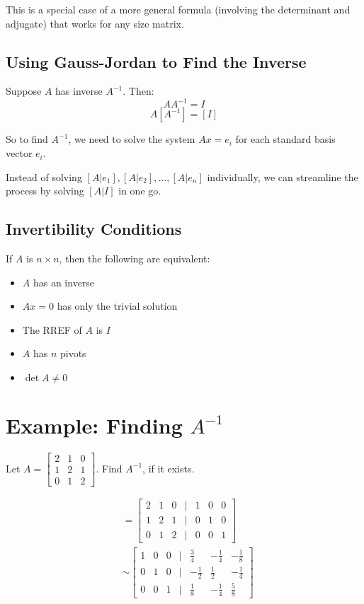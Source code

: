 \documentclass[12pt,a4paper]{article}
\begin{document}
This is a special case of a more general formula (involving the determinant and adjugate) that works for any size matrix.

\subsection{Using Gauss-Jordan to Find the Inverse}

Suppose $A$ has inverse $A^{-1}$. Then:
\[AA^{-1} = I\]
\[A[A^{-1}] = [I]\]

So to find $A^{-1}$, we need to solve the system $Ax = e_i$ for each standard basis vector $e_i$.

Instead of solving $[A|e_1], [A|e_2], \ldots, [A|e_n]$ individually, we can streamline the process by solving $[A|I]$ in one go.

\subsection{Invertibility Conditions}

If $A$ is $n \times n$, then the following are equivalent:
\begin{itemize}
    \item $A$ has an inverse
    \item $Ax = 0$ has only the trivial solution
    \item The RREF of $A$ is $I$
    \item $A$ has $n$ pivots
    \item $\det A \neq 0$
\end{itemize}

\section{Example: Finding $A^{-1}$}

Let $A = \begin{bmatrix} 2 & 1 & 0 \\ 1 & 2 & 1 \\ 0 & 1 & 2 \end{bmatrix}$. Find $A^{-1}$, if it exists.

\begin{align*}
    [A|I] &= \begin{bmatrix}
    2 & 1 & 0 & | & 1 & 0 & 0 \\
    1 & 2 & 1 & | & 0 & 1 & 0 \\
    0 & 1 & 2 & | & 0 & 0 & 1
    \end{bmatrix} \\
    &\sim \begin{bmatrix}
    1 & 0 & 0 & | & \frac{3}{4} & -\frac{1}{4} & -\frac{1}{8} \\
    0 & 1 & 0 & | & -\frac{1}{2} & \frac{1}{2} & -\frac{1}{4} \\
    0 & 0 & 1 & | & \frac{1}{8} & -\frac{1}{4} & \frac{5}{8}
    \end{bmatrix}
\end{align*}
\end{document}
